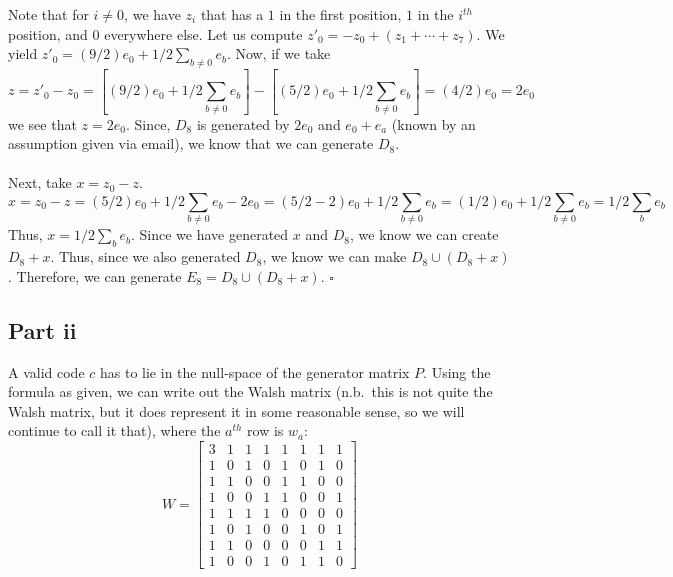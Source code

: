 \documentclass[letterpaper]{article}
\newcommand*{\QED}{\hfill\ensuremath{\square}}%
\begin{document}
Note that for $ i \neq 0 $, we have $ z_i $ that has a $ 1 $ in the first position, $ 1 $ in the $ i^{th} $ position, and $ 0 $ everywhere else.
Let us compute $ z'_0 = -z_0 + (z_1 + \cdots + z_7) $.
We yield $ z'_0 = (9/2) e_0 + 1/2 \sum_{b \neq 0} e_b $.
Now, if we take
\[
z = z'_0 - z_0 = \left[(9/2) e_0 + 1/2 \sum_{b \neq 0} e_b \right] - \left[(5/2) e_0 + 1/2 \sum_{b \neq 0} e_b \right] = (4/2) e_0 = 2 e_0
\]
we see that $ z = 2 e_0 $.
Since, $ D_8 $ is generated by $ 2 e_0 $ and $ e_0 + e_a $ (known by an assumption given via email), we know that we can generate $ D_8 $.
\\ \\
Next, take $ x = z_0 - z $.
\[
x = z_0 - z = (5/2) e_0 + 1/2 \sum_{b \neq 0} e_b - 2 e_0 =
(5/2 - 2) e_0 + 1/2 \sum_{b \neq 0} e_b =
(1/2) e_0 + 1/2 \sum_{b \neq 0} e_b =
1/2 \sum_{b} e_b
\]
Thus, $ x = 1/2 \sum_{b} e_b $.
Since we have generated $ x $ and $ D_8 $, we know we can create $ D_8 + x $.
Thus, since we also generated $ D_8 $, we know we can make $ D_8 \cup (D_8 + x) $.
Therefore, we can generate $ E_8 = D_8 \cup (D_8 + x) $.
\QED{}

\subsection{Part ii}
\label{subs:5Partii}

A valid code $ c $ has to lie in the null-space of the generator matrix $ P $.
Using the formula as given, we can write out the Walsh matrix (n.b.\ this is not quite the Walsh matrix, but it does represent it in some reasonable sense, so we will continue to call it that), where the $ a^{th} $ row is $ w_a $:
\begin{equation}
    \label{eqn:walsh-matrix}
    W =
    \begin{bmatrix}
        3 & 1 & 1 & 1 & 1 & 1 & 1 & 1 \\
        1 & 0 & 1 & 0 & 1 & 0 & 1 & 0 \\
        1 & 1 & 0 & 0 & 1 & 1 & 0 & 0 \\
        1 & 0 & 0 & 1 & 1 & 0 & 0 & 1 \\
        1 & 1 & 1 & 1 & 0 & 0 & 0 & 0 \\
        1 & 0 & 1 & 0 & 0 & 1 & 0 & 1 \\
        1 & 1 & 0 & 0 & 0 & 0 & 1 & 1 \\
        1 & 0 & 0 & 1 & 0 & 1 & 1 & 0
    \end{bmatrix}
\end{equation}
\end{document}
